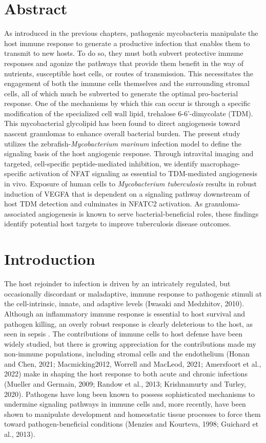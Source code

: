 \section{Abstract}

As introduced in the previous chapters, pathogenic mycobacteria manipulate the host immune response to generate a productive infection that enables them to transmit to new hosts. To do so, they must both subvert protective immune responses and agonize the pathways that provide them benefit in the way of nutrients, susceptible host cells, or routes of transmission. This necessitates the engagement of both the immune cells themselves and the surrounding stromal cells, all of which much be subverted to generate the optimal pro-bacterial response. One of the mechanisms by which this can occur is through a specific modification of the specialized cell wall lipid, trehalose 6-6'-dimycolate (TDM). This mycobacterial glycolipid has been found to direct angiogenesis toward nascent granulomas to enhance overall bacterial burden. The present study utilizes the zebrafish-\textit{Mycobacterium marinum} infection model to define the signaling basis of the host angiogenic response. Through intravital imaging and targeted, cell-specific peptide-mediated inhibition, we identify macrophage-specific activation of NFAT signaling as essential to TDM-mediated angiogenesis in vivo.  Exposure of human cells to \textit{Mycobacterium tuberculosis} results in robust induction of VEGFA that is dependent on a signaling pathway downstream of host TDM detection and culminates in NFATC2 activation. As granuloma-associated angiogenesis is known to serve bacterial-beneficial roles, these findings identify potential host targets to improve tuberculosis disease outcomes.

\section{Introduction}

The host rejoinder to infection is driven by an intricately regulated, but occasionally discordant or maladaptive, immune response to pathogenic stimuli at the cell-intrinsic, innate, and adaptive levels (Iwasaki and Medzhitov, 2010). Although an inflammatory immune response is essential to host survival and pathogen killing, an overly robust response is clearly deleterious to the host, as seen in sepsis \citep{}. The contributions of immune cells to host defense have been widely studied, but there is growing appreciation for the contributions made my non-immune populations, including stromal cells and the endothelium (Honan and Chen, 2021; Macmicking2012, Worrell and MacLeod, 2021; Amersfoort et al., 2022) make in shaping the host response to both acute and chronic infections (Mueller and Germain, 2009; Randow et al., 2013; Krishnamurty and Turley, 2020). Pathogens have long been known to possess sophisticated mechanisms to undermine signaling pathways in immune cells and, more recently, have been shown to manipulate development and homeostatic tissue processes to force them toward pathogen-beneficial conditions (Menzies and Kourteva, 1998; Guichard et al., 2013).


